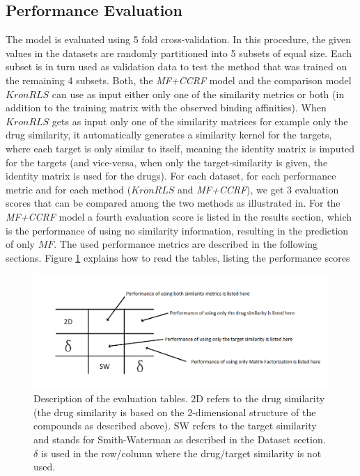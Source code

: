 \subsection{Performance Evaluation}
The model is evaluated using 5 fold cross-validation. In this procedure, the given values in the datasets are randomly partitioned into 5 subsets of equal size. Each subset is in turn used as validation data to test the method that was trained on the remaining 4 subsets. Both, the \textit{MF+CCRF} model and the comparison model $KronRLS$ can use as input either only one of the similarity metrics or both (in addition to the training matrix with the observed binding affinities). When $KronRLS$ gets as input only one of the similarity matrices for example only the drug similarity, it automatically generates a similarity kernel for the targets, where each target is only similar to itself, meaning the identity matrix is imputed for the targets (and vice-versa, when only the target-similarity is given, the identity matrix is used for the drugs). For each dataset, for each performance metric and for each method ($KronRLS$ and \textit{MF+CCRF}), we get 3 evaluation scores that can be compared among the two methods as illustrated in. For the \textit{MF+CCRF} model a fourth evaluation score is listed in the results section, which is the performance of using no similarity information, resulting in the prediction of only $MF$. The used performance metrics are described in the following sections. Figure \ref{fig:evaluation_tables} explains how to read the tables, listing the performance scores

\begin{figure}
\begin{center}
\includegraphics[scale=0.65]{evaluation_descr.png}
\end{center}
\caption[Description of evaluation tables]{\large{Description of the evaluation tables. 2D refers to the drug similarity (the drug similarity is based on the 2-dimensional structure of the compounds as described above). SW refers to the target similarity and stands for Smith-Waterman as described in the Dataset section. $\delta$ is used in the row/column where the drug/target similarity is not used.}}
\label{fig:evaluation_tables}
\end{figure}

